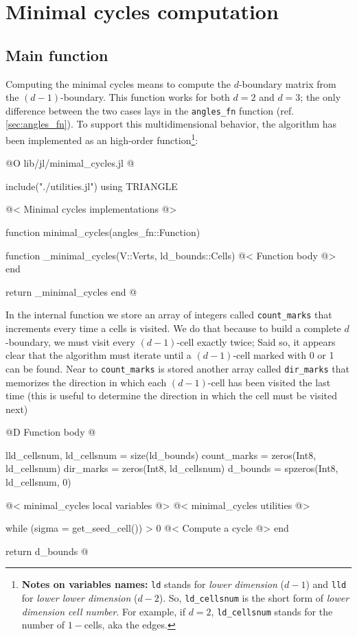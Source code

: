 \chapter{Minimal cycles computation}
\label{ch:minimal_cycles}

\section{Main function}


Computing the minimal cycles means to compute the $d$-boundary matrix
from the $(d-1)$-boundary. This function works for both $d=2$ and $d=3$;
the only difference between the two cases lays in the \texttt{angles\_fn}
function (ref. \ref{sec:angles_fn}). To support this multidimensional
behavior, the algorithm has been implemented as an high-order function\footnote{
    \textbf{Notes on variables names:} \texttt{ld} stands for \textit{lower dimension} ($d-1$)
    and \texttt{lld} for \textit{lower lower dimension} ($d-2$). So, \texttt{ld\_cellsnum} is the
    short form of \textit{lower dimension cell number}. For example, if $d=2$, \texttt{ld\_cellsnum} stands for the
    number of $1-$cells, aka the edges.
}:

@O lib/jl/minimal_cycles.jl
@{include("./utilities.jl")
using TRIANGLE

@< Minimal cycles implementations @>

function minimal_cycles(angles_fn::Function)

    function _minimal_cycles(V::Verts, ld_bounds::Cells)
        @< Function body @>
    end

    return _minimal_cycles
end
@}

In the internal function we store an array of integers called \texttt{count\_marks} 
that increments every time a cells is visited. We do that because to build 
a complete $d$-boundary, we must visit every $(d-1)$-cell exactly twice;
Said so, it appears clear that the algorithm must iterate until a $(d-1)$-cell 
marked with 0 or 1 can be found. Near to \texttt{count\_marks} is stored another
array called \texttt{dir\_marks} that memorizes the direction in which each $(d-1)$-cell
has been visited the last time (this is useful to determine the direction in which the cell
must be visited next)

@D Function body
@{lld_cellsnum, ld_cellsnum = size(ld_bounds)
count_marks = zeros(Int8, ld_cellsnum)
dir_marks = zeros(Int8, ld_cellsnum)
d_bounds = spzeros(Int8, ld_cellsnum, 0)

@< minimal\_cycles local variables @>
@< minimal\_cycles utilities @>

while (sigma = get_seed_cell()) > 0
    @< Compute a cycle @>
end

return d_bounds
@}

